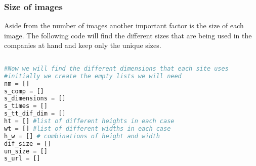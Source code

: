 \documentclass{article}
\begin{document}
\subsubsection{Size of images}
Aside from the number of images another important factor is the size of each image. The following code will find the different sizes that are being used in the companies at hand and keep only the unique sizes.
\begin{lstlisting}[language=Python]
 
#Now we will find the different dimensions that each site uses
#initially we create the empty lists we will need
nm = []
s_comp = []
s_dimensions = []
s_times = []
s_tt_dif_dim = []
ht = [] #list of different heights in each case
wt = [] #list of different widths in each case
h_w = [] # combinations of height and width
dif_size = []  
un_size = [] 
s_url = []
 



\end{lstlisting}
\end{document}
